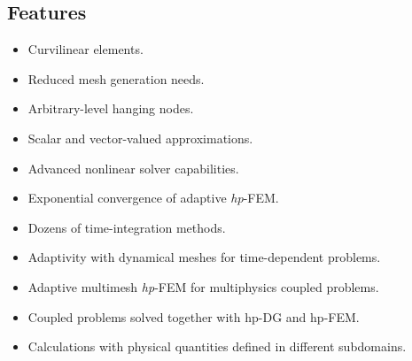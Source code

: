 \documentclass[a4paper,0pt,english]{sphinxmanual}
\begin{document}
\subsection{Features}
\label{src/math-background:features}\begin{itemize}
\item {} 
Curvilinear elements.

\item {} 
Reduced mesh generation needs.

\item {} 
Arbitrary-level hanging nodes.

\item {} 
Scalar and vector-valued approximations.

\item {} 
Advanced nonlinear solver capabilities.

\item {} 
Exponential convergence of adaptive \emph{hp}-FEM.

\item {} 
Dozens of time-integration methods.

\item {} 
Adaptivity with dynamical meshes for time-dependent problems.

\item {} 
Adaptive multimesh \emph{hp}-FEM for multiphysics coupled problems.

\item {} 
Coupled problems solved together with hp-DG and hp-FEM.

\item {} 
Calculations with physical quantities defined in different subdomains.

\end{itemize}
\end{document}
